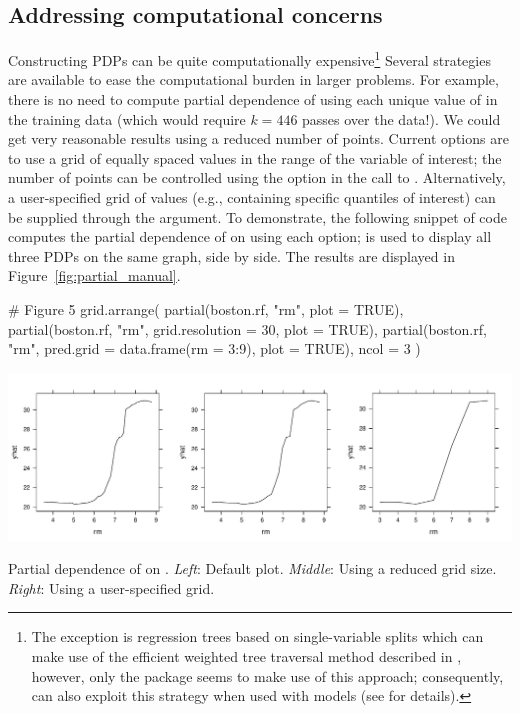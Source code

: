 \subsection{Addressing computational concerns}
\label{sec:computational}

Constructing PDPs can be quite computationally expensive\footnote{The exception is regression trees based on single-variable splits which can make use of the efficient weighted tree traversal method described in \citet{friedman-2001-greedy}, however, only the  package seems to make use of this approach; consequently,  can also exploit this strategy when used with  models (see  for details).} Several strategies are available to ease the computational burden in larger problems. For example, there is no need to compute partial dependence of  using each unique value of  in the training data (which would require $k = 446$ passes over the data!). We could get very reasonable results using a reduced number of points. Current options are to use a grid of equally spaced values in the range of the variable of interest; the number of points can be controlled using the  option in the call to . Alternatively, a user-specified grid of values (e.g., containing specific quantiles of interest) can be supplied through the  argument. To demonstrate, the following snippet of code computes the partial dependence of  on  using each option;  is used to display all three PDPs on the same graph, side by side. The results are displayed in Figure~\ref{fig:partial_manual}.
\begin{example}
# Figure 5
grid.arrange(
  partial(boston.rf, "rm", plot = TRUE),
  partial(boston.rf, "rm", grid.resolution = 30, plot = TRUE),
  partial(boston.rf, "rm", pred.grid = data.frame(rm = 3:9), plot = TRUE),
  ncol = 3
)
\end{example}

\begin{widefigure}[htbp]
  \centering
  \includegraphics[width=0.8\linewidth]{partial_manual}
  \caption{Partial dependence of  on . \textit{Left}: Default plot. \textit{Middle}: Using a reduced grid size. \textit{Right}: Using a user-specified grid.}
  \label{fig:partial_manual}
\end{widefigure}

